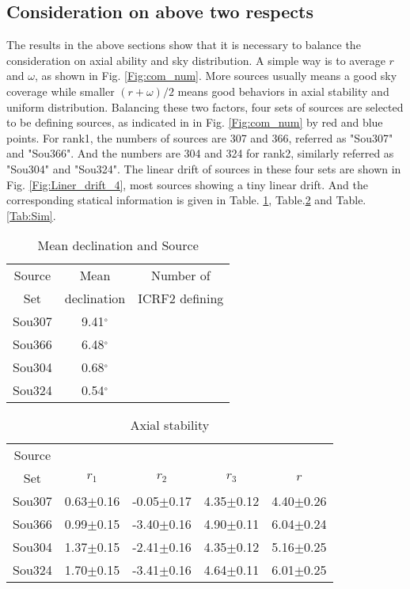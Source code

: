 \documentclass{aa}
\begin{document}
\subsection{Consideration on above two respects}
The results in the above sections show that it is necessary to balance the consideration on axial ability and sky distribution. A simple way is to average $r$ and $\omega$, as shown in Fig. \ref{Fig:com_num}. More sources usually means a good sky coverage while smaller $(r+\omega)/2$ means good behaviors in axial stability and uniform distribution. Balancing these two factors, four sets of sources are selected to be defining sources, as indicated in in Fig. \ref{Fig:com_num} by red and blue points. For rank1, the numbers of sources are 307 and 366, referred as "Sou307" and "Sou366". And the numbers are 304 and 324 for rank2, similarly referred as "Sou304" and "Sou324". The linear drift of sources in these four sets are shown in Fig. \ref{Fig:Liner_drift_4}, most sources showing a tiny linear drift. And the corresponding statical information is given in Table.  \ref{Tab:Mean_Dec}, Table.\ref{Tab:Axi} and Table.\ref{Tab:Sim}.

	\begin{table}
	\caption{Mean declination and Source}
	\label{Tab:Mean_Dec}
	\centering
	\begin{tabular}{ccc}
	\hline\hline
Source &Mean           &Number of         \\
Set    &declination    &ICRF2 defining    \\
Sou307& 9.41$^{\circ}$ &                 \\
Sou366& 6.48$^{\circ}$ &                 \\
Sou304& 0.68$^{\circ}$ &                 \\
Sou324& 0.54$^{\circ}$ &                 \\
\hline
	\end{tabular}
	\end{table}
	
	\begin{table}
	\centering
	\caption{Axial stability}
	\label{Tab:Axi}	
	\begin{tabular}{ccccc}
\hline\hline
Source &               &               &               &       \\
Set    &$r_1$          &$r_2$          &$r_3$          &$r$    \\
Sou307 &0.63$\pm$0.16 &-0.05$\pm$0.17 &4.35$\pm$0.12 &4.40$\pm$0.26 \\
Sou366 &0.99$\pm$0.15 &-3.40$\pm$0.16 &4.90$\pm$0.11 &6.04$\pm$0.24 \\
Sou304 &1.37$\pm$0.15 &-2.41$\pm$0.16 &4.35$\pm$0.12 &5.16$\pm$0.25 \\
Sou324 &1.70$\pm$0.15 &-3.41$\pm$0.16 &4.64$\pm$0.11 &6.01$\pm$0.25 \\
\hline
	\end{tabular}
	\end{table}	
	
\end{document}
